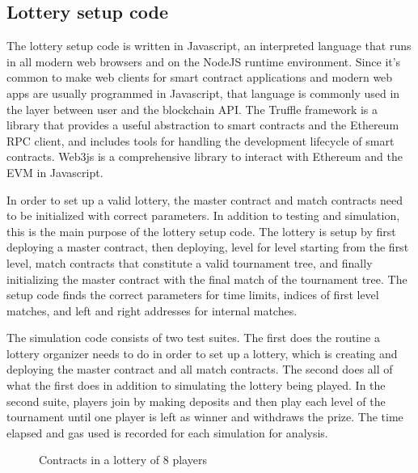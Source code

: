 



\subsection{Lottery setup code}
The lottery setup code is written in Javascript, an interpreted language that runs in all modern web browsers and on the NodeJS runtime environment. Since it's common to make web clients for smart contract applications and modern web apps are usually programmed in Javascript, that language is commonly used in the layer between user and the blockchain API. The Truffle framework is a library that provides a useful abstraction to smart contracts and the Ethereum RPC client, and includes tools for handling the development lifecycle of smart contracts. Web3js is a comprehensive library to interact with Ethereum and the EVM in Javascript.

In order to set up a valid lottery, the master contract and match contracts need to be initialized with correct parameters. In addition to testing and simulation, this is the main purpose of the lottery setup code. The lottery is setup by first deploying a master contract, then deploying, level for level starting from the first level, match contracts that constitute a valid tournament tree, and finally initializing the master contract with the final match of the tournament tree. The setup code finds the correct parameters for time limits, indices of first level matches, and left and right addresses for internal matches. 

The simulation code consists of two test suites. The first does the routine a lottery organizer needs to do in order to set up a lottery, which is creating and deploying the master contract and all match contracts. The second does all of what the first does in addition to simulating the lottery being played. In the second suite, players join by making deposits and then play each level of the tournament until one player is left as winner and withdraws the prize.
The time elapsed and gas used is recorded for each simulation for analysis.

\begin{figure}[htbp]
  \centering
  
  \caption{Contracts in a lottery of 8 players}
\end{figure}
